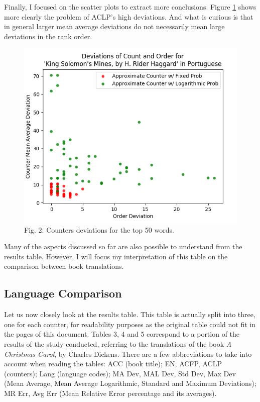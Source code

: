 \documentclass[shortpaper]{revdetua}
\begin{document}
Finally, I focused on the scatter plots to extract more conclusions.
Figure \ref{fig:2} shows more clearly the problem of ACLP's high deviations.
And what is curious is that in general larger mean average deviations do not 
necessarily mean large deviations in the rank order.

\vspace{-10pt}
\captionsetup[figure]{labelformat=empty}
\begin{figure}[H]
    \centering
    \setlength{\belowcaptionskip}{-12pt}
    \includegraphics[width=\linewidth]{counterComparison_KSM_PT.png}
    \caption{Fig. 2: Counters deviations for the top 50 words.} 
    \label{fig:2}
\end{figure}

Many of the aspects discussed so far are also possible to understand from the 
results table.
However, I will focus my interpretation of this table on the comparison between 
book translations.

\subsection{Language Comparison}

Let us now closely look at the results table.
This table is actually split into three, one for each counter, for readability
purposes as the original table could not fit in the pages of this document.
Tables 3, 4 and 5 correspond to a portion of the results of the study conducted,
referring to the translations of the book \textit{A Christmas Carol}, by Charles 
Dickens.
There are a few abbreviations to take into account when reading the tables:
ACC (book title); EN, ACFP, ACLP (counters); Lang (language codes); MA Dev, 
MAL Dev, Std Dev, Max Dev (Mean Average, Mean Average Logarithmic, Standard and
Maximum Deviations); MR Err, Avg Err (Mean Relative Error percentage and its averages).
\newline
\end{document}
